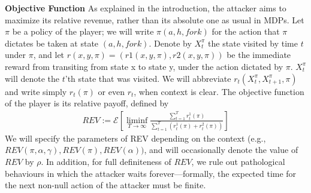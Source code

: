 \textbf{Objective Function}
As explained in the introduction, the attacker aims to maximize its relative revenue, rather than its absolute one as usual in MDPs. Let $\pi$ be a policy of the player; we will write $\pi(a, h, fork)$ for the action that $\pi$ dictates be taken at state $(a, h, fork)$. Denote by $X^{\pi}_t$ the state visited by time $t$ under $\pi$, and let $r(x, y, \pi) = (r1(x, y, \pi), r2(x, y, \pi))$ be the immediate reward from transiting from state x to state y, under the action dictated by $\pi$. $X^{\pi}_t$ will denote the $t$’th state that was visited. We will abbreviate $r_t(X^\pi_t ,X^\pi_{t+1}, \pi)$ and write simply $r_t(\pi)$ or even $r_t$, when context is clear. The objective function of the player is its relative payoff, defined by
\begin{align}
    REV := \mathcal{E} \left[ \liminf_{T \rightarrow \infty} \frac{\sum_{t=1}^T r_t^1(\pi)}{\sum_{t=1}^T(r_t^1(\pi)+r_t^2(\pi))} \right]    
\end{align}
We will specify the parameters of REV depending on the context (e.g.,
$REV(\pi, \alpha, \gamma), REV(\pi), REV(\alpha))$, and will occasionally denote the value of $REV$ by $\rho$. In addition, for full definiteness of $REV$, we rule out pathological behaviours in which the attacker waits forever—formally, the expected time for the next non-null action of the attacker must be finite.